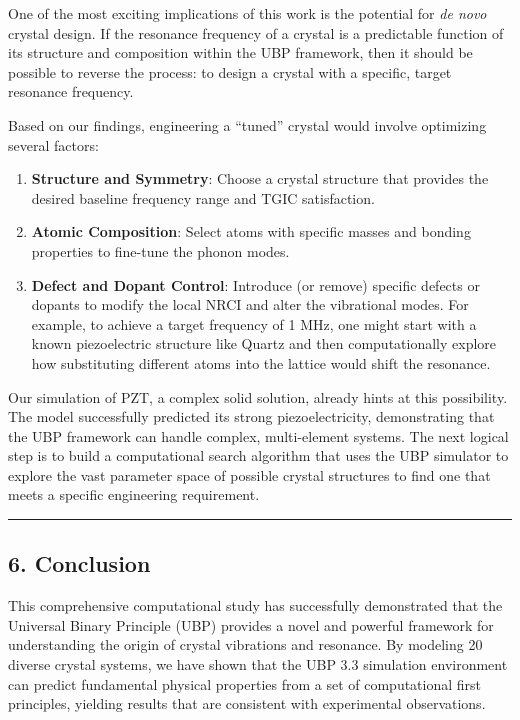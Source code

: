 One of the most exciting implications of this work is the potential for
\emph{de novo} crystal design. If the resonance frequency of a crystal
is a predictable function of its structure and composition within the
UBP framework, then it should be possible to reverse the process: to
design a crystal with a specific, target resonance frequency.

Based on our findings, engineering a ``tuned'' crystal would involve
optimizing several factors:

\begin{enumerate}
\def\labelenumi{\arabic{enumi}.}
\tightlist
\item
  \textbf{Structure and Symmetry}: Choose a crystal structure that
  provides the desired baseline frequency range and TGIC satisfaction.
\item
  \textbf{Atomic Composition}: Select atoms with specific masses and
  bonding properties to fine-tune the phonon modes.
\item
  \textbf{Defect and Dopant Control}: Introduce (or remove) specific
  defects or dopants to modify the local NRCI and alter the vibrational
  modes. For example, to achieve a target frequency of 1 MHz, one might
  start with a known piezoelectric structure like Quartz and then
  computationally explore how substituting different atoms into the
  lattice would shift the resonance.
\end{enumerate}

Our simulation of PZT, a complex solid solution, already hints at this
possibility. The model successfully predicted its strong
piezoelectricity, demonstrating that the UBP framework can handle
complex, multi-element systems. The next logical step is to build a
computational search algorithm that uses the UBP simulator to explore
the vast parameter space of possible crystal structures to find one that
meets a specific engineering requirement.

\begin{center}\rule{0.5\linewidth}{0.5pt}\end{center}

\subsection{6. Conclusion}\label{conclusion}

This comprehensive computational study has successfully demonstrated
that the Universal Binary Principle (UBP) provides a novel and powerful
framework for understanding the origin of crystal vibrations and
resonance. By modeling 20 diverse crystal systems, we have shown that
the UBP 3.3 simulation environment can predict fundamental physical
properties from a set of computational first principles, yielding
results that are consistent with experimental observations.

